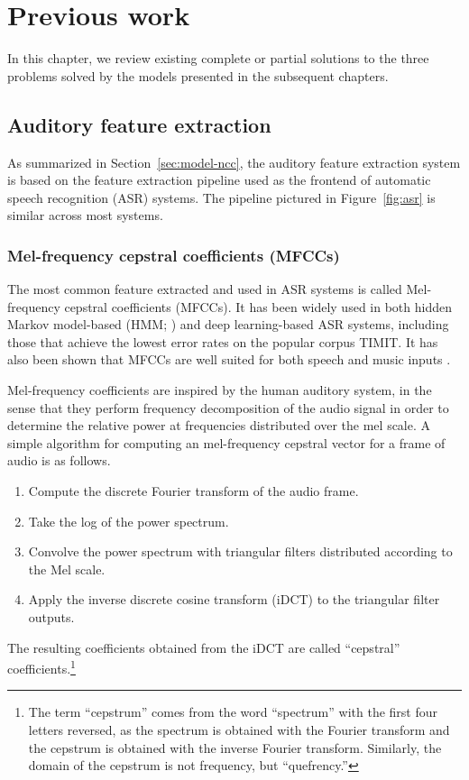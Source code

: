 \chapter{Previous work}
\label{chapt:previouswork}

In this chapter, we review
existing complete or partial solutions
to the three problems
solved by the models
presented in the subsequent chapters.

\section{Auditory feature extraction}

As summarized in Section~\ref{sec:model-ncc},
the auditory feature extraction system
is based on the feature extraction pipeline
used as the frontend
of automatic speech recognition (ASR) systems.
The pipeline pictured in Figure~\ref{fig:asr}
is similar across most systems.

\subsection{Mel-frequency cepstral coefficients (MFCCs)}
\label{sec:prev-mfcc}

The most common feature extracted
and used in ASR systems
is called Mel-frequency cepstral coefficients (MFCCs).
It has been widely used
in both hidden Markov model-based
(HMM; \citealp{hain1999,gales2008,gaikwad2010})
and deep learning-based
\citep{graves2006,graves2008,fernandez2008} ASR systems,
including those that achieve
the lowest error rates
on the popular corpus TIMIT.
It has also been shown that
MFCCs are well suited
for both speech and music inputs
\citep{logan2000}.

Mel-frequency coefficients are inspired
by the human auditory system,
in the sense that they perform
frequency decomposition
of the audio signal
in order to determine the relative power
at frequencies distributed over the mel scale.
A simple algorithm for computing an
mel-frequency cepstral vector
for a frame of audio is as follows.

\begin{enumerate}
  \item Compute the discrete Fourier transform
    of the audio frame.
  \item Take the log of the power spectrum.
  \item Convolve the power spectrum
    with triangular filters distributed
    according to the Mel scale.
  \item Apply the inverse discrete cosine transform (iDCT)
    to the triangular filter outputs.
\end{enumerate}
The resulting coefficients obtained from
the iDCT are called ``cepstral'' coefficients.\footnote{
  The term ``cepstrum'' comes from
  the word ``spectrum'' with the first four letters reversed,
  as the spectrum is obtained with the Fourier transform
  and the cepstrum is obtained with the inverse Fourier transform.
  Similarly, the domain of the cepstrum is not frequency,
  but ``quefrency.''}

